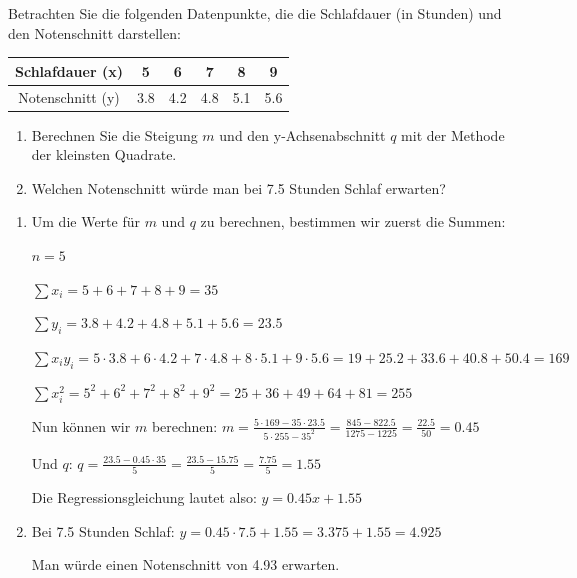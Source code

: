 \begin{mychallenge}
	Betrachten Sie die folgenden Datenpunkte, die die Schlafdauer (in Stunden) und den Notenschnitt darstellen:
	\begin{center}
		\begin{tabular}{cccccc}
			Schlafdauer (x)  & 5   & 6   & 7   & 8   & 9   \\\midrule
			Notenschnitt (y) & 3.8 & 4.2 & 4.8 & 5.1 & 5.6
		\end{tabular}
	\end{center}

	\begin{enumerate}
		\item Berechnen Sie die Steigung $m$ und den y-Achsenabschnitt $q$ mit der Methode der kleinsten Quadrate.
		\item Welchen Notenschnitt würde man bei 7.5 Stunden Schlaf erwarten?
	\end{enumerate}

	\begin{myanswer}
		\begin{enumerate}
			\item Um die Werte für $m$ und $q$ zu berechnen, bestimmen wir zuerst die Summen:

			      $n = 5$

			      $\sum x_i = 5 + 6 + 7 + 8 + 9 = 35$

			      $\sum y_i = 3.8 + 4.2 + 4.8 + 5.1 + 5.6 = 23.5$

			      $\sum x_i y_i = 5 \cdot 3.8 + 6 \cdot 4.2 + 7 \cdot 4.8 + 8 \cdot 5.1 + 9 \cdot 5.6 = 19 + 25.2 + 33.6 + 40.8 + 50.4 = 169$

			      $\sum x_i^2 = 5^2 + 6^2 + 7^2 + 8^2 + 9^2 = 25 + 36 + 49 + 64 + 81 = 255$

			      Nun können wir $m$ berechnen:
			      $m = \frac{5 \cdot 169 - 35 \cdot 23.5}{5 \cdot 255 - 35^2} = \frac{845 - 822.5}{1275 - 1225} = \frac{22.5}{50} = 0.45$

			      Und $q$:
			      $q = \frac{23.5 - 0.45 \cdot 35}{5} = \frac{23.5 - 15.75}{5} = \frac{7.75}{5} = 1.55$

			      Die Regressionsgleichung lautet also: $y = 0.45x + 1.55$

			\item Bei 7.5 Stunden Schlaf: $y = 0.45 \cdot 7.5 + 1.55 = 3.375 + 1.55 = 4.925$

			      Man würde einen Notenschnitt von 4.93 erwarten.
		\end{enumerate}
	\end{myanswer}
\end{mychallenge}

